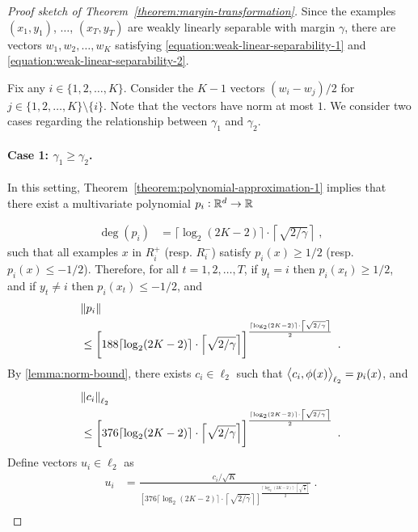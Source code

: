 \begin{proof}[Proof sketch of Theorem~\ref{theorem:margin-transformation}]
Since the examples $(x_1, y_1)$,  $\dots$, $(x_T, y_T)$ are weakly
linearly separable with margin $\gamma$, there are vectors $w_1, w_2, \dots, w_K$
satisfying \eqref{equation:weak-linear-separability-1} and
\eqref{equation:weak-linear-separability-2}.

Fix any $i \in \{1,2,\dots,K\}$. Consider the $K-1$ vectors $(w_i - w_j)/2$ for
$j \in \{1,2,\dots,K\} \setminus \{i\}$. Note that the vectors have norm at most
$1$. We consider two cases regarding the relationship between $\gamma_1$ and
$\gamma_2$.

\paragraph{Case 1: $\gamma_1 \geq \gamma_2$.} In this setting,
Theorem~\ref{theorem:polynomial-approximation-1} implies that there exist a
multivariate polynomial $p_i:\mathbb{R}^d \to \mathbb{R}$

\begin{align*}
\deg(p_i) & = \lceil \log_2(2K-2) \rceil \cdot \left\lceil \sqrt{{2}/{\gamma}} \right\rceil \; ,
\end{align*}
such that all examples $x$ in $R_i^+$ (resp. $R_i^-$) satisfy $p_i(x) \geq 1/2$
(resp. $p_i(x) \leq -1/2$).
Therefore, for all $t=1,2,\dots,T$, if $y_t = i$ then $p_i(x_t) \ge 1/2$,
 and if $y_t \neq i$ then $p_i(x_t) \le -1/2$, and
\begin{align*}
&\norm{p_i} 
\\
& \le 
\left[
  188 \lceil \log_2(2K-2) \rceil \cdot \left \lceil \sqrt{{2}/{\gamma}} \right \rceil 
\right]^{
  \frac{\lceil \log_2(2K-2) \rceil \cdot \left \lceil \sqrt{{2}/{\gamma}} \right \rceil }{2}
} \; . \\
\end{align*}
By \autoref{lemma:norm-bound}, there exists $c_i \in \ell_2$ such that
$\left\langle c_i, \phi(x) \right\rangle_{\ell_2} = p_i(x)$, and
\begin{align*}
&\norm{c_i}_{\ell_2}
\\
& \le 
\left[
  376 \lceil \log_2(2K-2) \rceil \cdot \left \lceil \sqrt{{2}/{\gamma}} \right \rceil 
\right]^{
  \frac{\lceil \log_2(2K-2) \rceil \cdot \left \lceil \sqrt{{2}/{\gamma}} \right \rceil}{2}
} \; .
\end{align*}
Define vectors $u_i \in \ell_2$ as
\begin{align*}
u_i & = 
\frac{c_i/\sqrt{K}}{ 
  \left[
    376 \lceil \log_2(2K-2) \rceil \cdot \left \lceil \sqrt{{2}/{\gamma}} \right \rceil 
  \right]^{
    \frac{\lceil \log_2(2K-2) \rceil \cdot \left \lceil \sqrt{\frac{2}{\gamma}} \right \rceil}{2}
  }
} \; . \\
\end{align*}


\end{proof}
